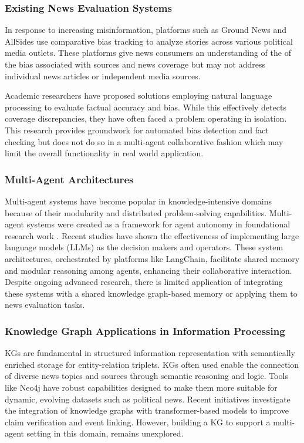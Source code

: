 \documentclass{scrartcl}
\begin{document}
\subsubsection{Existing News Evaluation Systems}
In response to increasing misinformation, platforms such as Ground News\cite{r18} and AllSides use comparative bias tracking to analyze stories across various political media outlets. These platforms give news consumers an understanding of the of the bias associated with sources and news coverage but may not address individual news articles or independent media sources. 

Academic researchers have proposed solutions employing natural language processing to evaluate factual accuracy and bias\cite{r19}. While this effectively detects coverage discrepancies, they have often faced a problem operating in isolation.  This research provides groundwork for automated bias detection and fact checking but does not do so in a multi-agent collaborative fashion which may limit the overall functionality in real world application.

\subsubsection{Multi-Agent Architectures}
Multi-agent systems have become popular in knowledge-intensive domains because of their modularity and distributed problem-solving capabilities. Multi-agent systems were created as a framework for agent autonomy in foundational research work \cite{r20}. Recent studies have shown the effectiveness of implementing large language models (LLMs) as the decision makers and operators\cite{r21}\cite{r22}. These system architectures, orchestrated by platforms like LangChain\cite{r23}, facilitate shared memory and modular reasoning among agents, enhancing their collaborative interaction. Despite ongoing advanced research, there is limited application of integrating these systems with a shared knowledge graph-based memory or applying them to news evaluation tasks.

\subsubsection{Knowledge Graph Applications in Information Processing}
KGs are fundamental in structured information representation with semantically enriched storage for entity-relation triplets. KGs often used enable the connection of diverse news topics and sources through semantic reasoning and logic. Tools like Neo4j have robust capabilities designed to make them more suitable for dynamic, evolving datasets such as political news. Recent initiatives \cite{r24}\cite{r25}investigate the integration of knowledge graphs with transformer-based models to improve claim verification and event linking. However, building a KG to support a multi-agent setting in this domain, remains unexplored.
\end{document}

